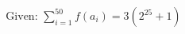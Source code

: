 \documentclass[preview]{standalone}
\begin{document}
\begin{align*}
\text{Given: } \sum_{i=1}^{50} f(a_i) = 3(2^{25} + 1)
\end{align*}
\end{document}
